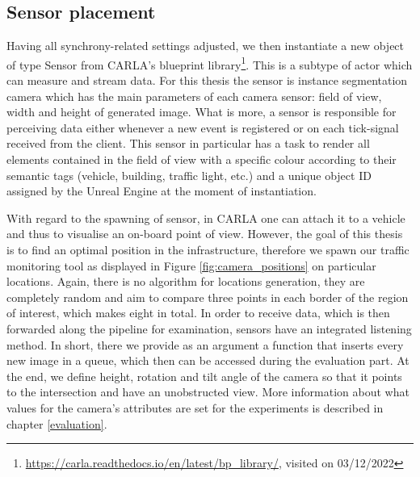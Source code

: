 \subsection{Sensor placement}
Having all synchrony-related settings adjusted, we then instantiate a new object of type Sensor from CARLA's blueprint library\footnote{\url{https://carla.readthedocs.io/en/latest/bp_library/}, visited on 03/12/2022}. This is a subtype of actor which can measure and stream data. For this thesis the sensor is instance segmentation camera which has the main parameters of each camera sensor: field of view, width and height of generated image. What is more, a sensor is responsible for perceiving data either whenever a new event is registered or on each tick-signal received from the client. This sensor in particular has a task to render all elements contained in the field of view with a specific colour according to their semantic tags (vehicle, building, traffic light, etc.) and a unique object ID assigned by the Unreal Engine at the moment of instantiation. 

With regard to the spawning of sensor, in CARLA one can attach it to a vehicle and thus to visualise an on-board point of view. However, the goal of this thesis is to find an optimal position in the infrastructure, therefore we spawn our traffic monitoring tool as displayed in Figure \ref{fig:camera_positions} on particular locations. Again, there is no algorithm for locations generation, they are completely random and aim to compare three points in each border of the region of interest, which makes eight in total. In order to receive data, which is then forwarded along the pipeline for examination, sensors have an integrated listening method. In short, there we provide as an argument a function that inserts every new image in a queue, which then can be accessed during the evaluation part. At the end, we define height, rotation and tilt angle of the camera so that it points to the intersection and have an unobstructed view. More information about what values for the camera's attributes are set for the experiments is described in chapter \ref{evaluation}.

